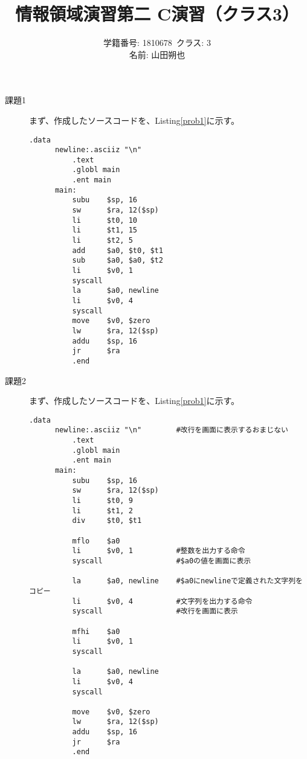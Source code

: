\documentclass{jsarticle}
\title{情報領域演習第二 C演習（クラス3）}
\author{学籍番号: 1810678\ クラス: 3 \\
        名前: 山田朔也}
\begin{document}
  \maketitle
  \begin{description}
      \item[課題1]
      まず、作成したソースコードを、Listing\ref{prob1}に示す。
      \begin{lstlisting}[caption=課題1のソースコード, label=prob1]
          .data
      newline:.asciiz "\n"
          .text
          .globl main
          .ent main
      main:
          subu    $sp, 16
          sw      $ra, 12($sp)
          li      $t0, 10
          li      $t1, 15
          li      $t2, 5
          add     $a0, $t0, $t1
          sub     $a0, $a0, $t2
          li      $v0, 1
          syscall
          la      $a0, newline
          li      $v0, 4
          syscall
          move    $v0, $zero
          lw      $ra, 12($sp)
          addu    $sp, 16
          jr      $ra
          .end
      \end{lstlisting}



      \item[課題2]
      まず、作成したソースコードを、Listing\ref{prob1}に示す。
      \begin{lstlisting}[caption=課題1のソースコード, label=prob1]
          .data
      newline:.asciiz "\n"        #改行を画面に表示するおまじない
          .text
          .globl main
          .ent main
      main:
          subu    $sp, 16
          sw      $ra, 12($sp)
          li      $t0, 9
          li      $t1, 2
          div     $t0, $t1

          mflo    $a0
          li      $v0, 1          #整数を出力する命令
          syscall                 #$a0の値を画面に表示

          la      $a0, newline    #$a0にnewlineで定義された文字列をコピー
          li      $v0, 4          #文字列を出力する命令
          syscall                 #改行を画面に表示

          mfhi    $a0
          li      $v0, 1
          syscall

          la      $a0, newline
          li      $v0, 4
          syscall

          move    $v0, $zero
          lw      $ra, 12($sp)
          addu    $sp, 16
          jr      $ra
          .end
      \end{lstlisting}




\end{description}
\end{document}
